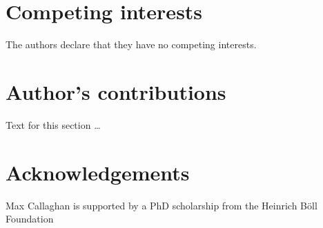 \documentclass{bmcart}
\begin{document}
	
\begin{backmatter}
	
	\section*{Competing interests}
	The authors declare that they have no competing interests.
	
	\section*{Author's contributions}
	Text for this section \ldots
	
	\section*{Acknowledgements}
	Max Callaghan is supported by a PhD scholarship from the Heinrich Böll Foundation
		
	
	
	
\end{backmatter}
\end{document}
